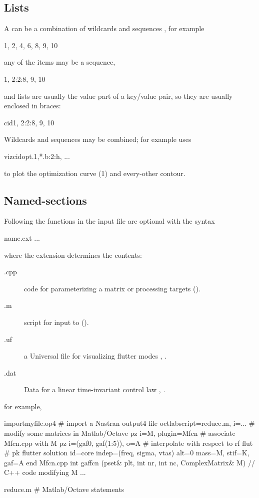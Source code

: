 \subsection{Lists}\label{sect:lists}
A  can be a combination of wildcards 
and sequences , for example
\begin{example}
1, 2, 4, 6, 8, 9, 10
\end{example}
any of the items may be a sequence,
\begin{example}
1, 2:2:8, 9, 10
\end{example}
and lists are usually the value part of a key/value pair, so they
are usually enclosed in braces:
\begin{example}
cid{1, 2:2:8, 9, 10}
\end{example}

Wildcards and sequences may be combined; for example  uses
\begin{example}
viz{cid{opt.1,*.b:2:h}, ...}
\end{example}
to plot the optimization curve (1) and every-other contour.

\subsection{Named-sections}
Following the \flaps functions in the input file are
optional  
with the syntax
\begin{example}
name.ext {{
  ...
}}
\end{example}
where the extension  determines the contents:
\begin{description}
\item[.cpp] \Cpp code for parameterizing a matrix 
	or processing targets ().
	\item[.m] \Octlab script for input to 
		().
	\item[.uf] a Universal file for visualizing flutter modes
		, .
	\item[.dat] Data for a linear time-invariant control law
		, .
\end{description}
for example,
\begin{example}
   import{myfile.op4}               # import a Nastran output4 file
   octlab{script=reduce.m, i=...}   # modify some matrices in Matlab/Octave
   pz {i=M, plugin=Mfcn}              # associate Mfcn.cpp with M
   pz { i=(gaf0, gaf(1:5)), o=A }   # interpolate with respect to rf
   flut{                            # pk flutter solution
      id=core
      indep=(freq, sigma, vtas)
      alt=0
      mass=M, stif=K, gaf=A
   }
   end
Mfcn.cpp {{
int gaffcn (pset& plt, int nr, int nc, ComplexMatrix& M) {
   // C++ code modifying M
  ...
}
}}

reduce.m {{
  # Matlab/Octave statements
}}
\end{example}

